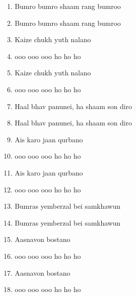 \documentclass[12pt]{article}
\newcommand{\bigroman}[1]{\fontsize{16pt}{18pt}\selectfont\RaggedRight #1}
\begin{document}
\begin{multicols}{2}
\begin{enumerate}[leftmargin=*, label=\arabic*., font=\fontsize{16pt}{18pt}\selectfont]
  \item \bigroman{Bumro bumro shaam rang bumroo}
  \item \bigroman{Bumro bumro shaam rang bumroo}
  \item \bigroman{Kaize chukh yuth nalano}
  \item \bigroman{ooo ooo ooo ho ho ho}
  \item \bigroman{Kaize chukh yuth nalano}
  \item \bigroman{ooo ooo ooo ho ho ho}
  \item \bigroman{Haal bhav panunei, ha shaam son diro}
  \item \bigroman{Haal bhav panunei, ha shaam son diro}
  \item \bigroman{Ais karo jaan qurbano}
  \item \bigroman{ooo ooo ooo ho ho ho}
  \item \bigroman{Ais karo jaan qurbano}
  \item \bigroman{ooo ooo ooo ho ho ho}
  \item \bigroman{Bumras yemberzal bei samkhawun}
  \item \bigroman{Bumras yemberzal bei samkhawun}
  \item \bigroman{Aasnavon bostano}
  \item \bigroman{ooo ooo ooo ho ho ho}
  \item \bigroman{Aasnavon bostano}
  \item \bigroman{ooo ooo ooo ho ho ho}
\end{enumerate}

\columnbreak


\end{multicols}
\end{document}
